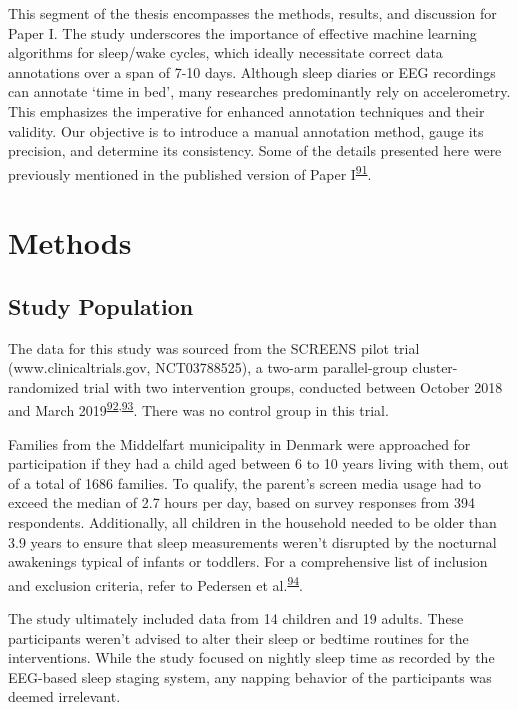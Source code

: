 \documentclass[
  9pt,
]{scrbook}
\begin{document}
This segment of the thesis encompasses the methods, results, and
discussion for Paper I. The study underscores the importance of
effective machine learning algorithms for sleep/wake cycles, which
ideally necessitate correct data annotations over a span of 7-10 days.
Although sleep diaries or EEG recordings can annotate `time in bed',
many researches predominantly rely on accelerometry. This emphasizes the
imperative for enhanced annotation techniques and their validity. Our
objective is to introduce a manual annotation method, gauge its
precision, and determine its consistency. Some of the details presented
here were previously mentioned in the published version of Paper
I\textsuperscript{\protect\hyperlink{ref-skovgaard_manual_2021}{91}}.

\hypertarget{methods}{%
\section{Methods}\label{methods}}

\hypertarget{study-population}{%
\subsection{Study Population}\label{study-population}}

The data for this study was sourced from the SCREENS pilot trial
(www.clinicaltrials.gov, NCT03788525), a two-arm parallel-group
cluster-randomized trial with two intervention groups, conducted between
October 2018 and March
2019\textsuperscript{\protect\hyperlink{ref-rasmussen_feasibility_2021}{92},\protect\hyperlink{ref-rasmussen_short-term_2020}{93}}.
There was no control group in this trial.

Families from the Middelfart municipality in Denmark were approached for
participation if they had a child aged between 6 to 10 years living with
them, out of a total of 1686 families. To qualify, the parent's screen
media usage had to exceed the median of 2.7 hours per day, based on
survey responses from 394 respondents. Additionally, all children in the
household needed to be older than 3.9 years to ensure that sleep
measurements weren't disrupted by the nocturnal awakenings typical of
infants or toddlers. For a comprehensive list of inclusion and exclusion
criteria, refer to Pedersen et
al.\textsuperscript{\protect\hyperlink{ref-pedersen_self-administered_2021}{94}}.

The study ultimately included data from 14 children and 19 adults. These
participants weren't advised to alter their sleep or bedtime routines
for the interventions. While the study focused on nightly sleep time as
recorded by the EEG-based sleep staging system, any napping behavior of
the participants was deemed irrelevant.
\end{document}
